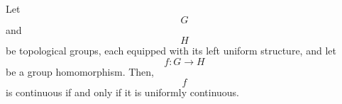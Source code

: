 Let $$G$$ and $$H$$ be topological groups, each equipped with its left uniform structure, and let $$f: G \rightarrow H$$ be a group homomorphism. Then, $$f$$ is continuous if and only if it is uniformly continuous.
